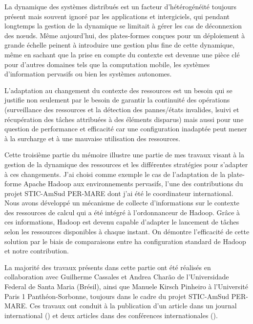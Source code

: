 \begin{resume}

%

La dynamique des systèmes distribués est un facteur d'hétérogénéité toujours présent mais souvent ignoré par les applications et intergiciels, qui pendant longtemps la gestion de la dynamique se limitait à gérer les cas de déconnexion des n{\oe}uds. Même aujourd'hui, des plates-formes conçues pour un déploiement à grande échelle peinent à introduire une gestion plus fine de cette dynamique, même en sachant que la prise en compte du contexte est devenue une pièce clé pour d'autres domaines tels que la computation mobile, les systèmes d'information pervasifs ou bien les systèmes autonomes.

L'adaptation au changement du contexte des ressources est un besoin qui se justifie non seulement par le besoin de garantir la continuité des opérations (surveillance des ressources et la détection des pannes/états invalides, lsuivi et récupération des tâches attribuées à des éléments disparus) mais aussi pour une question de performance et efficacité car une configuration inadaptée peut mener à la surcharge et à une mauvaise utilisation des ressources. 

Cette troisième partie du mémoire illustre une partie de mes travaux visant à la gestion de la dynamique des ressources et les différentes stratégies pour s'adapter à ces changements. J'ai choisi comme exemple le cas de l'adaptation de la plate-forme Apache Hadoop aux environnements pervasifs, l'une des contributions du projet STIC-AmSud PER-MARE dont j'ai été le coordinateur international. Nous avons développé un mécanisme de collecte d'informations sur le contexte des ressources de calcul qui a été intégré à l'ordonnanceur de Hadoop. Grâce à ces informations, Hadoop est devenu capable d'adapter le lancement de tâches selon les ressources disponibles à chaque instant. On démontre l'efficacité de cette solution par le biais de comparaisons entre ha configuration standard de Hadoop et notre contribution. 

La majorité des travaux présents dans cette partie ont été réalisés en collaboration avec Guilherme Cassales et Andrea Charão de l'Universidade Federal de Santa Maria (Brésil), ainsi que Manuele Kirsch Pinheiro à l'Université Paris 1 Panthéon-Sorbonne, toujours dans le cadre du projet STIC-AmSud PER-MARE. Ces travaux ont conduit à la publication d'un article dans un journal international (\cite{Steffenel2016-JAIHC}) et deux articles dans des conférences internationales (\cite{Steffenel2015-ANT, Steffenel2014-Hadoop}).


\end{resume}

